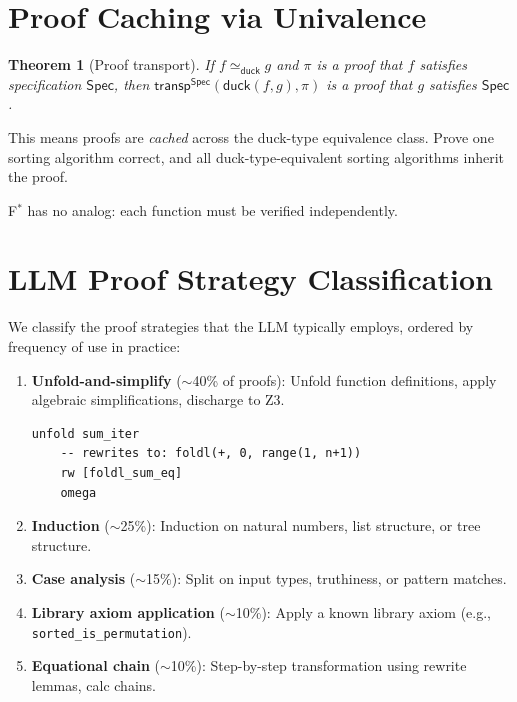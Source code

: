 \documentclass[11pt,a4paper]{report}
\theoremstyle{definition}
\theoremstyle{plain}
\newtheorem{theorem}[definition]{Theorem}
\newcommand{\transp}{\mathsf{transp}}
\newcommand{\Spec}{\mathsf{Spec}}
\newcommand{\fstar}{F$^{*}$}
\begin{document}
\section{Proof Caching via Univalence}

\begin{theorem}[Proof transport]
\label{thm:proof-transport}
If $f \simeq_{\mathsf{duck}} g$ and $\pi$ is a proof that $f$ satisfies
specification $\Spec$, then $\transp^{\Spec}(\mathsf{duck}(f, g), \pi)$
is a proof that $g$ satisfies $\Spec$.
\end{theorem}

This means proofs are \emph{cached} across the duck-type equivalence class.
Prove one sorting algorithm correct, and all duck-type-equivalent sorting
algorithms inherit the proof.

\fstar{} has no analog: each function must be verified independently.


\section{LLM Proof Strategy Classification}

We classify the proof strategies that the LLM typically employs, ordered by
frequency of use in practice:

\begin{enumerate}
  \item \textbf{Unfold-and-simplify} ($\sim$40\% of proofs): Unfold function
    definitions, apply algebraic simplifications, discharge to Z3.
    \begin{lstlisting}[style=proof]
    unfold sum_iter
    -- rewrites to: foldl(+, 0, range(1, n+1))
    rw [foldl_sum_eq]
    omega
    \end{lstlisting}

  \item \textbf{Induction} ($\sim$25\%): Induction on natural numbers, list
    structure, or tree structure.

  \item \textbf{Case analysis} ($\sim$15\%): Split on input types, truthiness,
    or pattern matches.

  \item \textbf{Library axiom application} ($\sim$10\%): Apply a known library
    axiom (e.g., \texttt{sorted\_is\_permutation}).

  \item \textbf{Equational chain} ($\sim$10\%): Step-by-step transformation
    using rewrite lemmas, calc chains.
\end{enumerate}
\end{document}

